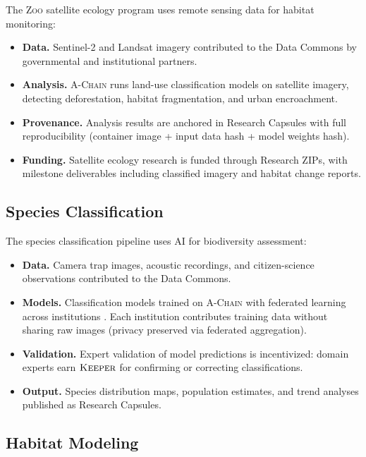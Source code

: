 \documentclass[11pt,letterpaper]{article}
\theoremstyle{definition}
\theoremstyle{remark}
\newcommand{\Zoo}{\textsc{Zoo}}
\newcommand{\AChain}{\textsc{A-Chain}}
\newcommand{\KEEPER}{\textsc{Keeper}}
\begin{document}
The \Zoo{} satellite ecology program \cite{zoo-satellite-ecology} uses remote sensing data for habitat monitoring:

\begin{itemize}
    \item \textbf{Data.} Sentinel-2 and Landsat imagery contributed to the Data Commons by governmental and institutional partners.
    \item \textbf{Analysis.} \AChain{} runs land-use classification models on satellite imagery, detecting deforestation, habitat fragmentation, and urban encroachment.
    \item \textbf{Provenance.} Analysis results are anchored in Research Capsules with full reproducibility (container image + input data hash + model weights hash).
    \item \textbf{Funding.} Satellite ecology research is funded through Research ZIPs, with milestone deliverables including classified imagery and habitat change reports.
\end{itemize}

\subsection{Species Classification}

The species classification pipeline \cite{zoo-species-classification} uses AI for biodiversity assessment:

\begin{itemize}
    \item \textbf{Data.} Camera trap images, acoustic recordings, and citizen-science observations contributed to the Data Commons.
    \item \textbf{Models.} Classification models trained on \AChain{} with federated learning across institutions \cite{zoo-federated-wildlife}. Each institution contributes training data without sharing raw images (privacy preserved via federated aggregation).
    \item \textbf{Validation.} Expert validation of model predictions is incentivized: domain experts earn $\KEEPER$ for confirming or correcting classifications.
    \item \textbf{Output.} Species distribution maps, population estimates, and trend analyses published as Research Capsules.
\end{itemize}

\subsection{Habitat Modeling}
\end{document}
